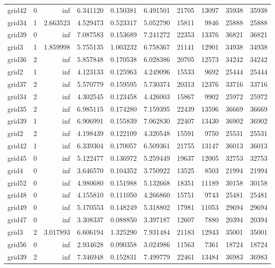 \begin{longtable}{|l|r|r|r|r|r|r|r|r|r|}
grid42 & 0 & inf & 6.341120 & 0.150381 & 6.491501 & 21705 & 13097 & 35938 & 35938 \\
grid34 & 1 & 2.663523 & 4.529473 & 0.523317 & 5.052790 & 15811 & 9846 & 25888 & 25888 \\
grid39 & 0 & inf & 7.087583 & 0.153689 & 7.241272 & 22353 & 13376 & 36821 & 36821 \\
grid3 & 1 & 1.859998 & 5.755135 & 1.003232 & 6.758367 & 21141 & 12901 & 34938 & 34938 \\
grid36 & 2 & inf & 5.857848 & 0.170538 & 6.028386 & 20705 & 12573 & 34242 & 34242 \\
grid2 & 1 & inf & 4.123133 & 0.125963 & 4.249096 & 15533 & 9692 & 25444 & 25444 \\
grid37 & 2 & inf & 5.570779 & 0.159595 & 5.730374 & 20313 & 12376 & 33716 & 33716 \\
grid34 & 2 & inf & 4.302545 & 0.123458 & 4.426003 & 15867 & 9902 & 25972 & 25972 \\
grid35 & 2 & inf & 6.985115 & 0.174280 & 7.159395 & 22439 & 13596 & 36669 & 36669 \\
grid39 & 1 & inf & 6.906991 & 0.155839 & 7.062830 & 22407 & 13430 & 36902 & 36902 \\
grid2 & 2 & inf & 4.198439 & 0.122109 & 4.320548 & 15591 & 9750 & 25531 & 25531 \\
grid42 & 1 & inf & 6.339304 & 0.170057 & 6.509361 & 21755 & 13147 & 36013 & 36013 \\
grid45 & 0 & inf & 5.122477 & 0.136972 & 5.259449 & 19637 & 12005 & 32753 & 32753 \\
grid4 & 0 & inf & 3.646570 & 0.104352 & 3.750922 & 13525 & 8503 & 21994 & 21994 \\
grid52 & 0 & inf & 4.980680 & 0.151988 & 5.132668 & 18351 & 11189 & 30158 & 30158 \\
grid48 & 0 & inf & 4.155810 & 0.111050 & 4.266860 & 15751 & 9743 & 25481 & 25481 \\
grid49 & 0 & inf & 5.170553 & 0.148249 & 5.318802 & 17981 & 11053 & 29694 & 29694 \\
grid47 & 0 & inf & 3.308337 & 0.088850 & 3.397187 & 12607 & 7880 & 20394 & 20394 \\
grid3 & 2 & 3.017893 & 6.606194 & 1.325290 & 7.931484 & 21183 & 12943 & 35001 & 35001 \\
grid56 & 0 & inf & 2.934628 & 0.090358 & 3.024986 & 11563 & 7361 & 18724 & 18724 \\
grid39 & 2 & inf & 7.346948 & 0.152831 & 7.499779 & 22461 & 13484 & 36983 & 36983 \\

\end{longtable}
